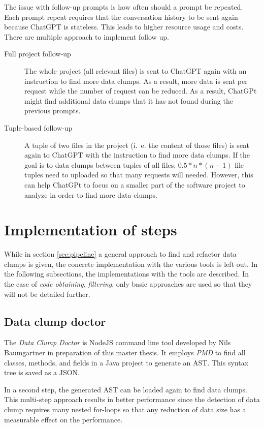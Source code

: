 The issue  with follow-up prompts is how often should a prompt be repeated. Each prompt repeat requires that the conversation history to be sent again because ChatGPT is stateless. This leads to higher resource usage and costs. There are multiple approach to implement follow up.
\begin{description}
\item[Full project follow-up] The whole project (all relevant files) is sent to  ChatGPT again with an instruction to find more data clumps. As a result, more data is sent per  request while the number of request can be reduced. As a  result, ChatGPt might find additional data clumps that it has not found during the previous prompts.
\item [Tuple-based follow-up] A tuple of two files in the project (i.~e. the content of those files) is sent again to ChatGPT with the instruction to find more data clumps. If the goal is to data clumps between tuples of all files, $0.5*n*(n-1)$ file tuples need to uploaded so that many requests will needed. However, this can help ChatGPt to focus on a smaller part of the software project to analyze in order to find more data clumps.
\end{description}
\section{Implementation of steps}
While in section \ref{sec:pipeline} a general approach to find and refactor data clumps is given, the concrete implementation with the various tools is left out. In the following subsections, the implementations with the tools are described. In the case of \textit{code obtaining}, \textit{filtering}, only basic approaches are used so that they will not be detailed further. 


\subsection{Data clump doctor}

The  \textit{Data Clump Doctor} is NodeJS command line tool developed by Nils Baumgartner in preparation of this master thesis. It employs \textit{PMD} to find all classes, methods, and fields in a Java project to generate an \ac{AST}. This syntax tree is saved as a \ac{JSON}. 

In a second step, the generated \ac{AST} can be loaded again to find data clumps. This multi-step approach results in better performance since the detection of data clump requires many nested for-loops so that any reduction of data size has a measurable effect on the performance.

